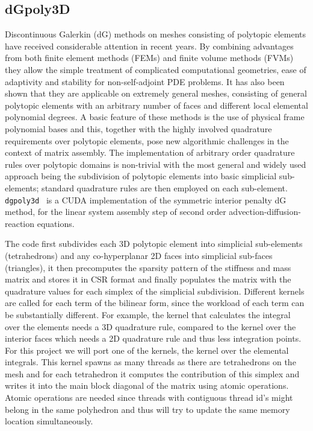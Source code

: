 \documentclass[../main]{subfiles}
\begin{document}
\subsection{dGpoly3D}\label{sec:dgpoly3d}

Discontinuous Galerkin (dG) methods on meshes consisting of polytopic elements have received considerable attention in recent years.
By combining advantages from both finite element methods (FEMs) and finite volume methods (FVMs) they allow the simple treatment of complicated computational geometries, ease of adaptivity and stability for non-self-adjoint PDE problems.
It has also been shown that they are applicable on extremely general meshes, consisting of general polytopic elements with an arbitrary number of faces and different local elemental polynomial degrees.
A basic feature of these methods is the use of physical frame polynomial bases and this, together with the highly involved quadrature requirements over polytopic elements, pose new algorithmic challenges in the context of matrix assembly.
The implementation of arbitrary order quadrature rules over polytopic domains is non-trivial with the most general and widely used approach being the subdivision of polytopic elements into basic simplicial sub-elements; standard quadrature rules are then employed on each sub-element.
\texttt{dgpoly3d}~\cite{dong_gpu-accelerated_2021} is a CUDA implementation of the symmetric interior penalty dG method, for the linear system assembly step of second order advection-diffusion-reaction equations.

The code first subdivides each 3D polytopic element into simplicial sub-elements (tetrahedrons) and any co-hyperplanar 2D faces into simplicial sub-faces (triangles), it then precomputes the sparsity pattern of the stiffness and mass matrix and stores it in CSR format and finally populates the matrix with the quadrature values for each simplex of the simplicial subdivision.
Different kernels are called for each term of the bilinear form, since the workload of each term can be substantially different.
For example, the kernel that calculates the integral over the elements needs a 3D quadrature rule, compared to the kernel over the interior faces which needs a 2D quadrature rule and thus less integration points.
For this project we will port one of the kernels, the kernel over the elemental integrals.
This kernel spawns as many threads as there are tetrahedrons on the mesh and for each tetrahedron it computes the contribution of this simplex and writes it into the main block diagonal of the matrix using atomic operations.
Atomic operations are needed since threads with contiguous thread id's might belong in the same polyhedron and thus will try to update the same memory location simultaneously.
\end{document}
